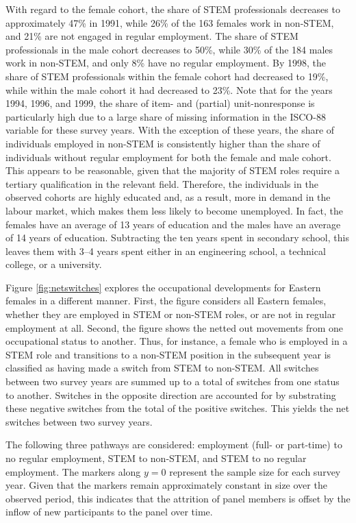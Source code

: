 \documentclass[a4paper, oneside, hyperfootnotes = false]{article}
\begin{document}
{With regard to the female cohort, the share of STEM professionals decreases to approximately 47\% in 1991, while 26\% of the 163 females work in non-STEM, and 21\% are not engaged in regular employment.
The share of STEM professionals in the male cohort decreases to 50\%, while 30\% of the 184 males work in non-STEM, and only 8\% have no regular employment.
By 1998, the share of STEM professionals within the female cohort had decreased to 19\%, while within the male cohort it had decreased to 23\%.
Note that for the years 1994, 1996, and 1999, the share of item- and (partial) unit-nonresponse is particularly high due to a large share of missing information in the ISCO-88 variable for these survey years.
With the exception of these years, the share of individuals employed in non-STEM is consistently higher than the share of individuals without regular employment for both the female and male cohort.
This appears to be reasonable, given that the majority of STEM roles require a tertiary qualification in the relevant field.
Therefore, the individuals in the observed cohorts are highly educated and, as a result, more in demand in the labour market, which makes them less likely to become unemployed.
In fact, the females have an average of 13 years of education and the males have an average of 14 years of education.
Subtracting the ten years spent in secondary school, this leaves them with 3--4 years spent either in an engineering school, a technical college, or a university.

Figure \ref{fig:netswitches} explores the occupational developments for Eastern females in a different manner.
First, the figure considers all Eastern females, whether they are employed in STEM or non-STEM roles, or are not in regular employment at all.
Second, the figure shows the netted out movements from one occupational status to another.
Thus, for instance, a female who is employed in a STEM role and transitions to a non-STEM position in the subsequent year is classified as having made a switch from STEM to non-STEM.
All switches between two survey years are summed up to a total of switches from one status to another.
Switches in the opposite direction are accounted for by substrating these negative switches from the total of the positive switches.
This yields the net switches between two survey years.

The following three pathways are considered: employment (full- or part-time) to no regular employment, STEM to non-STEM, and STEM to no regular employment.
The markers along $y = 0$ represent the sample size for each survey year.
Given that the markers remain approximately constant in size over the observed period, this indicates that the attrition of panel members is offset by the inflow of new participants to the panel over time.

}
\end{document}
